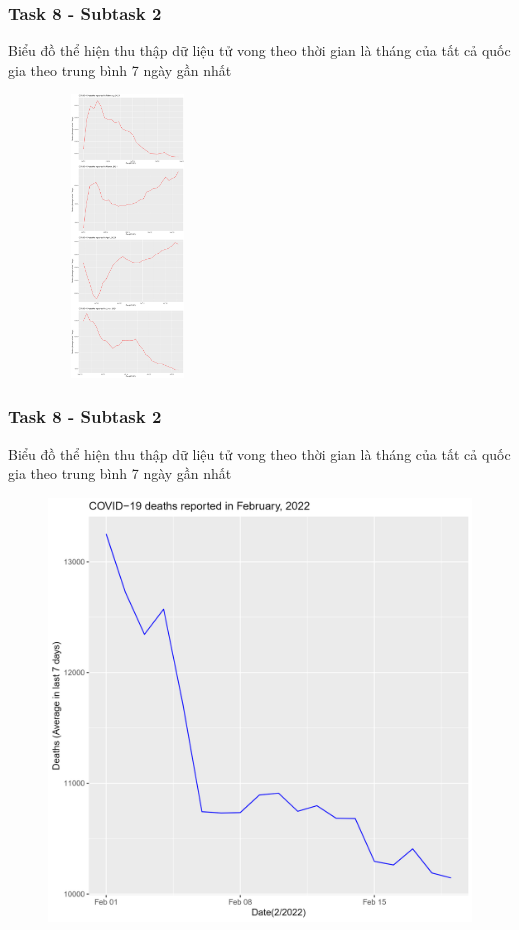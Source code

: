 \documentclass[english,10pt,table]{beamer}
\begin{document}
\frame
{
    \frametitle{Task 8 - Subtask 2}
    \begin{block}{Biểu đồ thể hiện thu thập dữ liệu tử vong theo thời gian là tháng của tất cả quốc gia theo trung bình 7 ngày gần nhất}
    \begin{figure}[H]
			\centering
			\includegraphics[height=7.5cm,width=4.2cm]{images/8.2.2.png}
	\end{figure}
    \end{block}
}
\frame
{
    \frametitle{Task 8 - Subtask 2}
    \begin{block}{Biểu đồ thể hiện thu thập dữ liệu tử vong theo thời gian là tháng của tất cả quốc gia theo trung bình 7 ngày gần nhất}
    \begin{figure}[H]
			\centering
			\includegraphics[scale=0.1]{images/8.2.3.png}
	\end{figure}
    \end{block}
}
\end{document}
